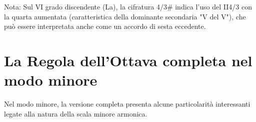 \begin{esempio}
	\label{ex:regola_completa_disc_magg}
	Nota: Sul VI grado discendente (La), la cifratura 4/3\# indica l'uso del II4/3 con la quarta aumentata (caratteristica della dominante secondaria "V del V"), che può essere interpretata anche come un accordo di sesta eccedente.
\end{esempio}

\section{La Regola dell'Ottava completa nel modo minore}
\label{sec:regola_completa_minore}

Nel modo minore, la versione completa presenta alcune particolarità interessanti legate alla natura della scala minore armonica.

